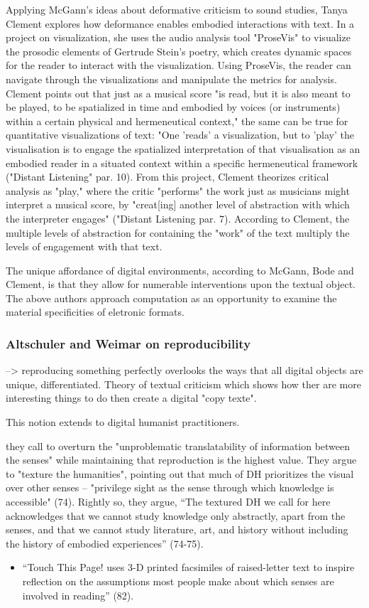\documentclass[11pt]{article}
\begin{document}
Applying McGann's ideas about deformative criticism to sound studies,
Tanya Clement explores how deformance enables embodied interactions
with text. In a project on visualization, she uses the audio analysis
tool "ProseVis" to visualize the prosodic elements of Gertrude Stein's
poetry, which creates dynamic spaces for the reader to interact with
the visualization. Using ProseVis, the reader can navigate through the
visualizations and manipulate the metrics for analysis. Clement points
out that just as a musical score "is read, but it is also meant to be
played, to be spatialized in time and embodied by voices (or
instruments) within a certain physical and hermeneutical context," the
same can be true for quantitative visualizations of text: "One 'reads'
a visualization, but to 'play' the visualisation is to engage the
spatialized interpretation of that visualisation as an embodied reader
in a situated context within a specific hermeneutical framework
("Distant Listening" par. 10). From this project, Clement theorizes
critical analysis as "play," where the critic "performs" the work just
as musicians might interpret a musical score, by "creat[ing] another
level of abstraction with which the interpreter engages" ("Distant
Listening par. 7). According to Clement, the multiple levels of
abstraction for containing the "work" of the text multiply the levels
of engagement with that text.

The unique affordance of digital environments, according to McGann,
Bode and Clement, is that they allow for numerable interventions upon
the textual object. The above authors approach computation as an
opportunity to examine the material specificities of eletronic
formats.

\subsubsection{Altschuler and Weimar on reproducibility}
\label{sec:orgab382d8}

--> reproducing something perfectly overlooks the ways that all
digital objects are unique, differentiated. Theory of textual
criticism which shows how ther are more interesting things to do then
create a digital "copy texte". 

This notion extends to digital humanist practitioners. 

they call to overturn the "unproblematic translatability of
information between the senses" while maintaining that reproduction is
the highest value. They argue to "texture the humanities", pointing
out that much of DH prioritizes the visual over other senses --
"privilege sight as the sense through which knowledge is accessible"
(74). Rightly so, they argue, “The textured DH we call for here
acknowledges that we cannot study knowledge only abstractly, apart
from the senses, and that we cannot study literature, art, and history
without including the history of embodied experiences” (74-75).
\begin{itemize}
\item “Touch This Page! uses 3-D printed facsimiles of raised-letter text
to inspire reflection on the assumptions most people make about
which senses are involved in reading” (82).
\end{itemize}
\end{document}
